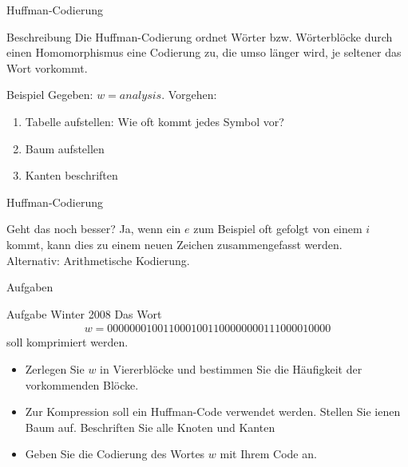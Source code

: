\begin{frame}{Huffman-Codierung}
    \begin{block}{Beschreibung}
        Die Huffman-Codierung ordnet Wörter bzw. Wörterblöcke durch einen Homomorphismus eine Codierung zu, die umso länger wird, je seltener das Wort vorkommt.
        
    \end{block}
    \begin{exampleblock}{Beispiel}
        Gegeben: $w = analysis$. Vorgehen:
        \begin{enumerate}
            \item Tabelle aufstellen: Wie oft kommt jedes Symbol vor?
            \item Baum aufstellen
            \item Kanten beschriften
        \end{enumerate}
    \end{exampleblock}
\end{frame}
\begin{frame}{Huffman-Codierung}
    \begin{block}{Geht das noch besser?}
        Ja, wenn ein $e$ zum Beispiel oft gefolgt von einem $i$ kommt, kann dies zu einem neuen Zeichen zusammengefasst werden.\\
        Alternativ: Arithmetische Kodierung.
    \end{block}
\end{frame}
\begin{frame}{Aufgaben}
    \begin{exampleblock}{Aufgabe Winter 2008}
        Das Wort
        \begin{align*}
            w = 0000 0001 0011 0001 0011 0000 0000 1110 0001 0000
        \end{align*}
        soll komprimiert werden.
        \begin{itemize}
            \item Zerlegen Sie $w$ in Viererblöcke und bestimmen Sie die Häufigkeit der vorkommenden Blöcke.
            \item Zur Kompression soll ein Huffman-Code verwendet werden. Stellen Sie ienen Baum auf. Beschriften Sie alle Knoten und Kanten
            \item Geben Sie die Codierung des Wortes $w$ mit Ihrem Code an.
        \end{itemize}
    \end{exampleblock}
\end{frame}
